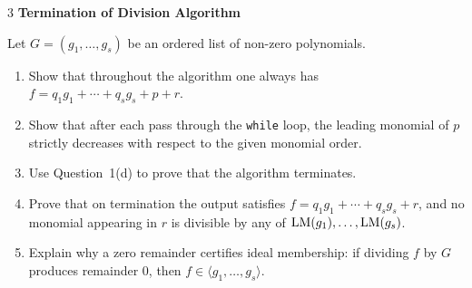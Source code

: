 \documentclass[Notebook.tex]{subfiles}
\begin{document}
\begin{problem}{3} \textbf{Termination of Division Algorithm} 
    
    Let $G=(g_1,\ldots,g_s)$ be an ordered list of non-zero polynomials.
    \begin{enumerate}
        \item Show that throughout the algorithm one always has $f=q_1g_1+\cdots+q_sg_s+p+r$.
        
        \item Show that after each pass through the \texttt{while} loop, the leading monomial of $p$ strictly decreases with respect to the given monomial order.
        
        \item Use Question~1(d) to prove that the algorithm terminates.
        
        \item Prove that on termination the output satisfies $f=q_1g_1+\cdots+q_sg_s+r$, and no monomial appearing in $r$ is divisible by any of $\text{LM}(g_1),\ldots,\text{LM}(g_s)$.
        
        \item Explain why a zero remainder certifies ideal membership: if dividing $f$ by $G$ produces remainder $0$, then $f\in \langle g_1,\ldots,g_s\rangle$.
    \end{enumerate}
\end{problem}
\end{document}
